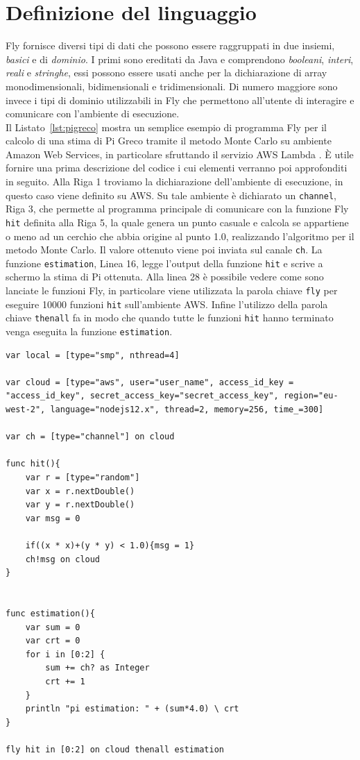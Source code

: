 \section{Definizione del linguaggio}
Fly fornisce diversi tipi di dati che possono essere raggruppati in due insiemi, \textit{basici} e di \textit{dominio}. I primi sono ereditati da Java e comprendono \textit{booleani}, \textit{interi}, \textit{reali} e \textit{stringhe}, essi possono essere usati anche per la dichiarazione di array monodimensionali, bidimensionali e tridimensionali. Di numero maggiore sono invece i tipi di dominio utilizzabili in Fly che permettono all'utente di interagire e comunicare con l'ambiente di esecuzione.\\
Il Listato~\ref{lst:pigreco} mostra un semplice esempio di programma Fly per il calcolo di una stima di Pi Greco tramite il metodo Monte Carlo su ambiente Amazon Web Services, in particolare sfruttando il servizio AWS Lambda \cite{LambdaSite}. È utile fornire una prima descrizione del codice i cui elementi verranno poi approfonditi in seguito. Alla Riga 1 troviamo la dichiarazione dell'ambiente di esecuzione, in questo caso viene definito su AWS. Su tale ambiente è dichiarato un \verb|channel|, Riga 3, che permette al programma principale di comunicare con la funzione Fly \verb|hit| definita alla Riga 5, la quale genera un punto casuale e calcola se appartiene o meno ad un cerchio che abbia origine al punto 1.0, realizzando l'algoritmo per il metodo Monte Carlo. Il valore ottenuto viene poi inviata sul canale \verb|ch|. La funzione \verb|estimation|, Linea 16, legge l'output della funzione \verb|hit| e scrive a schermo la stima di Pi ottenuta. Alla linea 28 è possibile vedere come sono lanciate le funzioni Fly, in particolare viene utilizzata la parola chiave \verb|fly| per eseguire 10000 funzioni \verb|hit| sull'ambiente AWS. Infine l'utilizzo della parola chiave \verb|thenall| fa in modo che quando tutte le funzioni \verb|hit| hanno terminato venga eseguita la funzione \verb|estimation|.\\

\begin{lstlisting}[language=FLY,caption={Stima di PI Greco usando il metodo Monte Carlo su ambiente AWS.}, label={lst:pigreco}]
var local = [type="smp", nthread=4]

var cloud = [type="aws", user="user_name", access_id_key = "access_id_key", secret_access_key="secret_access_key", region="eu-west-2", language="nodejs12.x", thread=2, memory=256, time_=300]

var ch = [type="channel"] on cloud

func hit(){	
    var r = [type="random"]
    var x = r.nextDouble()
    var y = r.nextDouble()
    var msg = 0
    
    if((x * x)+(y * y) < 1.0){msg = 1}
    ch!msg on cloud
}


func estimation(){
    var sum = 0
    var crt = 0
    for i in [0:2] {
        sum += ch? as Integer
        crt += 1
    }
    println "pi estimation: " + (sum*4.0) \ crt
}

fly hit in [0:2] on cloud thenall estimation  
\end{lstlisting}  


